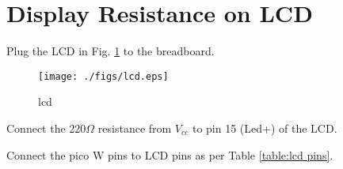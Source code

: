 \documentclass[journal,12pt,twocolumn]{IEEEtran}
\begin{document}
\section{Display Resistance on LCD}
%
\begin{problem}
Plug the LCD in Fig. \ref{fig:lcd} to the breadboard.
\end{problem}
%
\begin{figure}
\centering
\texttt{[image: ./figs/lcd.eps]}
\caption{lcd}
\label{fig:lcd}
\end{figure}
%
\begin{problem}
Connect the 220$\Omega$ resistance from $V_{cc}$ to pin 15 (Led+) of the LCD.
\end{problem}
%
\begin{problem}
Connect the pico W pins to LCD pins as per Table \ref{table:lcd pins}.
\end{problem}
%

\end{document}
